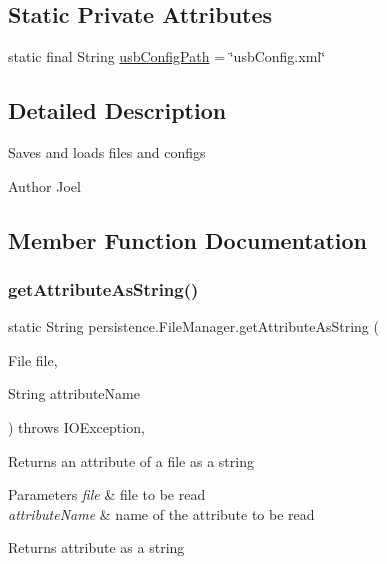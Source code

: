 \subsection*{Static Private Attributes}
\begin{DoxyCompactItemize}
\item 
static final String \mbox{\hyperlink{classpersistence_1_1_file_manager_a41f3194a363708961b2e56f3f93c3786}{usb\+Config\+Path}} = \char`\"{}usb\+Config.\+xml\char`\"{}
\end{DoxyCompactItemize}


\subsection{Detailed Description}
Saves and loads files and configs \begin{DoxyAuthor}{Author}
Joel 
\end{DoxyAuthor}


\subsection{Member Function Documentation}
\mbox{\label{classpersistence_1_1_file_manager_a2cb506a3762432736083455b762e840b}} 
\subsubsection{\texorpdfstring{get\+Attribute\+As\+String()}{getAttributeAsString()}}
{\footnotesize\ttfamily static String persistence.\+File\+Manager.\+get\+Attribute\+As\+String (\begin{DoxyParamCaption}\item[{File}]{file,  }\item[{String}]{attribute\+Name }\end{DoxyParamCaption}) throws I\+O\+Exception\hspace{0.3cm}{\ttfamily [static]}, {\ttfamily [private]}}

Returns an attribute of a file as a string 
\begin{DoxyParams}{Parameters}
{\em file} & file to be read \\
\hline
{\em attribute\+Name} & name of the attribute to be read \\
\hline
\end{DoxyParams}
\begin{DoxyReturn}{Returns}
attribute as a string 
\end{DoxyReturn}

